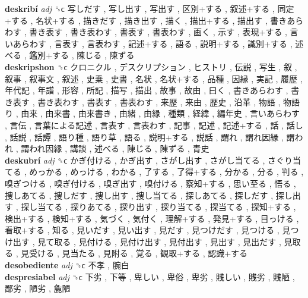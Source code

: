 \textbf{deskribí} \emph{adj}  ␝ϲ   写しだす ,  写し出す ,  写出す ,  区別+する ,  叙述+する ,  同定+する ,  名状+する ,  描きだす ,  描き出す ,  描く ,  描出+する ,  描出す ,  書きあらわす ,  書き表す ,  書き表わす ,  書表す ,  書表わす ,  画く ,  示す ,  表現+する ,  言いあらわす ,  言表す ,  言表わす ,  記述+する ,  語る ,  説明+する ,  識別+する ,  述べる ,  鑑別+する ,  陳じる ,  陳ずる   \\
\textbf{deskripshon} ␝ϲ   クロニクル ,  デスクリプション ,  ヒストリ ,  伝説 ,  写生 ,  叙 ,  叙事 ,  叙事文 ,  叙述 ,  史乗 ,  史書 ,  名状 ,  名状+する ,  品種 ,  因縁 ,  実記 ,  履歴 ,  年代記 ,  年譜 ,  形容 ,  所記 ,  描写 ,  描出 ,  故事 ,  故由 ,  曰く ,  書きあらわす ,  書き表す ,  書き表わす ,  書表す ,  書表わす ,  来歴 ,  来由 ,  歴史 ,  沿革 ,  物語 ,  物語り ,  由来 ,  由来書 ,  由来書き ,  由緒 ,  由縁 ,  種類 ,  経緯 ,  編年史 ,  言いあらわす ,  言伝 ,  言葉による記述 ,  言表す ,  言表わす ,  記事 ,  記述 ,  記述+する ,  話 ,  話し ,  話説 ,  話譚 ,  語り種 ,  語り草 ,  語る ,  説明+する ,  説話 ,  謂れ ,  謂れ因縁 ,  謂われ ,  謂われ因縁 ,  講談 ,  述べる ,  陳じる ,  陳ずる ,  青史   \\
\textbf{deskubrí} \emph{adj}  ␝ϲ   かぎ付ける ,  かぎ出す ,  さがし出す ,  さがし当てる ,  さぐり当てる ,  めっかる ,  めっける ,  わかる ,  了する ,  了得+する ,  分かる ,  分る ,  判る ,  嗅ぎつける ,  嗅ぎ付ける ,  嗅ぎ出す ,  嗅付ける ,  察知+する ,  思い至る ,  悟る ,  捜しあてる ,  捜しだす ,  捜し出す ,  捜し当てる ,  探しあてる ,  探しだす ,  探し出す ,  探し当てる ,  探りあてる ,  探り出す ,  探り当てる ,  探当てる ,  探知+する ,  検出+する ,  検知+する ,  気づく ,  気付く ,  理解+する ,  発見+する ,  目っける ,  看取+する ,  知る ,  見いだす ,  見い出す ,  見だす ,  見つけだす ,  見つける ,  見つけ出す ,  見て取る ,  見付ける ,  見付け出す ,  見付出す ,  見出す ,  見出だす ,  見取る ,  見受ける ,  見当たる ,  見附る ,  覚る ,  観取+する ,  認識+する   \\
\textbf{desobediente} \emph{adj}  ␝ϲ   不孝 ,  腕白   \\
\textbf{despresiabel} \emph{adj}  ␝ϲ   下劣 ,  下等 ,  卑しい ,  卑俗 ,  卑劣 ,  賎しい ,  賎劣 ,  賎陋 ,  鄙劣 ,  陋劣 ,  麁陋   \\
